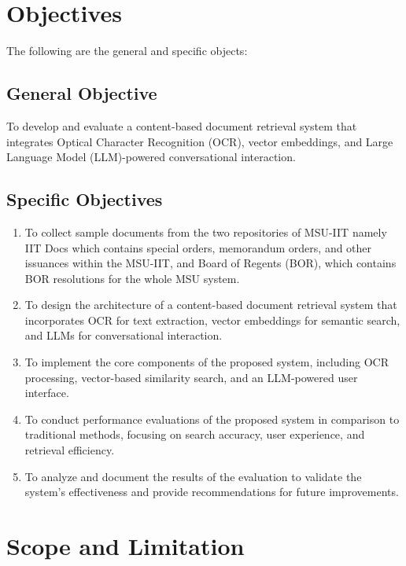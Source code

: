 \section{Objectives}
The following are the general and specific objects:

\subsection{General Objective}

\noindent To develop and evaluate a content-based document retrieval system that integrates Optical Character Recognition (OCR), vector embeddings, and Large Language Model (LLM)-powered conversational interaction.

\subsection{Specific Objectives}
\begin{enumerate}
    \item To collect sample documents from the two repositories of MSU-IIT namely IIT Docs which contains special orders, memorandum orders, and other issuances within the MSU-IIT, and Board of Regents (BOR), which contains BOR resolutions for the whole MSU system.
    \item To design the architecture of a content-based document retrieval system that incorporates OCR for text extraction, vector embeddings for semantic search, and LLMs for conversational interaction.
    \item To implement the core components of the proposed system, including OCR processing, vector-based similarity search, and an LLM-powered user interface.
    \item To conduct performance evaluations of the proposed system in comparison to traditional methods, focusing on search accuracy, user experience, and retrieval efficiency.
    \item To analyze and document the results of the evaluation to validate the system's effectiveness and provide recommendations for future improvements.
\end{enumerate}

\section{Scope and Limitation}

